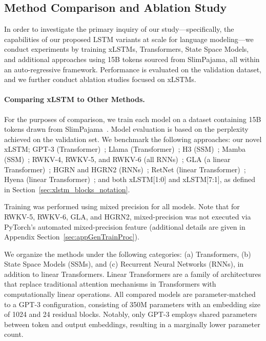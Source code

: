 \subsection{Method Comparison and Ablation Study}
\label{sec:ExpComparison}

In order to investigate the primary inquiry of our study—specifically, the capabilities of our proposed LSTM variants at scale for language modeling—we conduct experiments by training xLSTMs, Transformers, State Space Models, and additional approaches using 15B tokens sourced from SlimPajama, all within an auto-regressive framework. Performance is evaluated on the validation dataset, and we further conduct ablation studies focused on xLSTMs.

\paragraph{Comparing xLSTM to Other Methods.} For the purposes of comparison, we train each model on a dataset containing 15B tokens drawn from SlimPajama~\citep{Soboleva:23}. Model evaluation is based on the perplexity achieved on the validation set. We benchmark the following approaches: our novel xLSTM; GPT-3 (Transformer)~\citep{Brown:20short}; Llama (Transformer)~\citep{Touvron:23arxiv}; H3 (SSM)~\citep{Fu:23}; Mamba (SSM)~\citep{Gu:24arxiv}; RWKV-4, RWKV-5, and RWKV-6 (all RNNs)~\citep{Peng:23arxivshort, Peng:24arxivshort}; GLA (a linear Transformer)~\citep{Yang:23arxiv}; HGRN and HGRN2 (RNNs)~\citep{Qin:23, Qin:24arxiv}; RetNet (linear Transformer)~\citep{Sun:23arxiv}; Hyena (linear Transformer)~\citep{Poli:23}; and both xLSTM[1:0] and xLSTM[7:1], as defined in Section~\ref{sec:xlstm_blocks_notation}. 

Training was performed using mixed precision for all models. Note that for RWKV-5, RWKV-6, GLA, and HGRN2, mixed-precision was not executed via PyTorch's automated mixed-precision feature (additional details are given in Appendix Section~\ref{sec:appGenTrainProc}).

We organize the methods under the following categories: (a) Transformers, (b) State Space Models (SSMs), and (c) Recurrent Neural Networks (RNNs), in addition to linear Transformers. Linear Transformers are a family of architectures that replace traditional attention mechanisms in Transformers with computationally linear operations. All compared models are parameter-matched to a GPT-3 configuration, consisting of 350M parameters with an embedding size of 1024 and 24 residual blocks. Notably, only GPT-3 employs shared parameters between token and output embeddings, resulting in a marginally lower parameter count.

